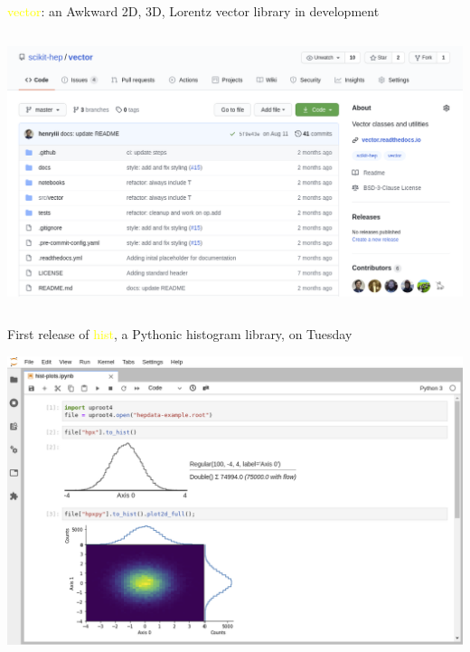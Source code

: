 \documentclass[aspectratio=169]{beamer}
\begin{document}
\begin{frame}{\textcolor{yellow}{vector}: an Awkward 2D, 3D, Lorentz vector library in development}
\vspace{0.17 cm}
\begin{columns}
\includegraphics[width=\linewidth]{img/vector-github.png}
\end{columns}
\end{frame}

\begin{frame}{First release of \textcolor{yellow}{hist}, a Pythonic histogram library, on Tuesday}
\vspace{0.18 cm}
\begin{center}
\includegraphics[width=0.85\linewidth]{img/hist-plots.png}
\end{center}
\end{frame}
\end{document}

